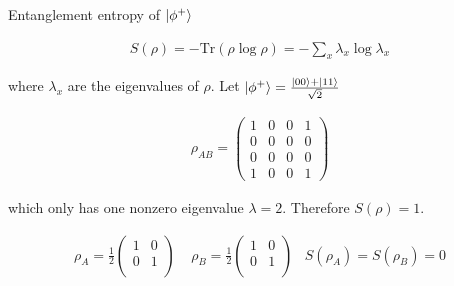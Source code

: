 \documentclass[aspectratio=1610]{beamer}					%
\begin{document}
\begin{frame}{Entanglement entropy of $\ket{\phi^{+}}$}

\begin{align*}
S(\rho) = -\mathrm{Tr}(\rho\log\rho) = -\sum_{x}\lambda_{x}\log\lambda_{x}
\end{align*}

where $\lambda_{x}$ are the eigenvalues of $\rho$. Let $\ket{\phi^{+}} = \frac{\ket{00} + \ket{11}}{\sqrt{2}}$

\begin{align*}
\rho_{AB} = 
\begin{pmatrix}
1 & 0 & 0 & 1 \\
0 & 0 & 0 & 0 \\
0 & 0 & 0 & 0 \\
1 & 0 & 0 & 1
\end{pmatrix}
\end{align*}

which only has one nonzero eigenvalue $\lambda = 2$. Therefore $S(\rho) = 1$.

\begin{align*}
\rho_{A} = \frac{1}{2}\begin{pmatrix}
1 & 0\\
0 & 1\\
\end{pmatrix}\;\;\;\;
\rho_{B} = \frac{1}{2}\begin{pmatrix}
1 & 0\\
0 & 1\\
\end{pmatrix}\;\;\; S(\rho_{A}) = S(\rho_{B}) = 0  
\end{align*}


\end{frame}
\end{document}
